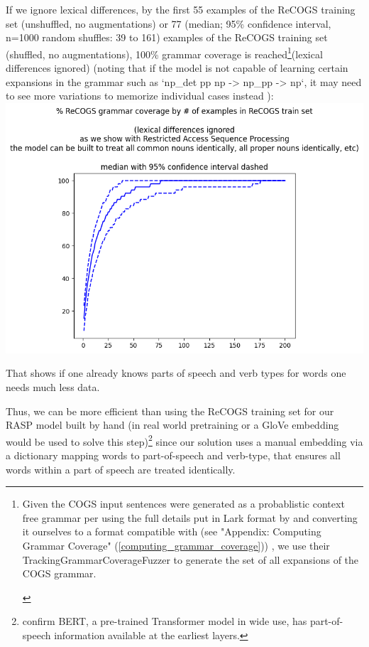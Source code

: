 \documentclass[11pt]{article}
\begin{document}
If we ignore lexical differences, by the first 55 examples of the ReCOGS training set (unshuffled, no augmentations) or 77 (median; 95\% confidence interval, n=1000 random shuffles: 39 to 161) examples of the ReCOGS training set (shuffled, no augmentations), 100\% grammar coverage is reached\footnote{\begin{footnotesize}Given the COGS input sentences were generated as a probablistic context free grammar per \citep{KimLinzen2020}
using the full details put in Lark format by \citep{klinger2024compositionalprogramgenerationfewshot}
and converting it ourselves to a format compatible with \citep{fuzzingbook2023:GrammarCoverageFuzzer} (see "Appendix: Computing Grammar Coverage" (\ref{computing_grammar_coverage})) , we use their TrackingGrammarCoverageFuzzer to generate the set of all expansions of the COGS grammar.
\end{footnotesize}
}(lexical differences ignored) \citep{fuzzingbook2023:GrammarCoverageFuzzer} (noting that if the model is not capable of learning certain expansions in the grammar such as `np\_det pp np -> np\_pp -> np`, it may need to see more variations to memorize individual cases instead ):
\includegraphics[scale=0.38]{grammar_coverage_by_number_of_recogs_training_examples_lexical_differences_ignored.png}

That shows if one already knows parts of speech and verb types for words one needs much less data.

Thus, we can be more efficient than using the ReCOGS training set for our RASP model built by hand (in real world pretraining or a GloVe embedding would be used to solve this step)\footnote{\citep{tenney2019bertrediscoversclassicalnlp} confirm BERT, a pre-trained Transformer model in wide use, has part-of-speech information available at the earliest layers.}
 since our solution uses a manual embedding via a dictionary mapping words to part-of-speech and verb-type, that ensures all words within a part of speech are treated identically.
\end{document}
